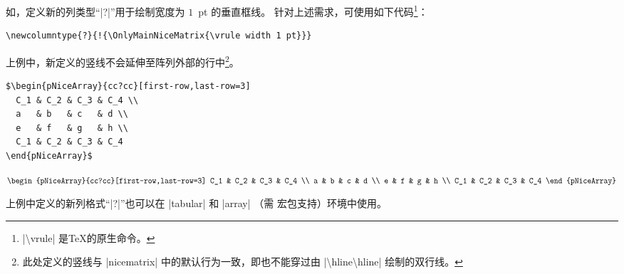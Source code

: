 \documentclass[dvipsnames]{article}%
\begin{document}
如，定义新的列类型“|?|”用于绘制宽度为 $1$~pt 的垂直框线。
针对上述需求，可使用如下代码\footnote{|\textbackslash vrule| 是\TeX 的原生命令。}：

\begin{Verbatim}
\newcolumntype{?}{!{\OnlyMainNiceMatrix{\vrule width 1 pt}}}
\end{Verbatim}

上例中，新定义的竖线不会延伸至阵列外部的行中\footnote{此处定义的竖线与 |nicematrix| 中的默认行为一致，即也不能穿过由 |\textbackslash hline\textbackslash hline| 绘制的双行线。}。
\medskip
\begin{scope}

\begin{BVerbatim}[baseline = c, boxwidth = 10.5cm]
$\begin{pNiceArray}{cc?cc}[first-row,last-row=3]
  C_1 & C_2 & C_3 & C_4 \\
  a   & b   & c   & d \\
  e   & f   & g   & h \\
  C_1 & C_2 & C_3 & C_4
\end{pNiceArray}$
\end{BVerbatim}
$\begin{pNiceArray}{cc?cc}[first-row,last-row=3]
C_1 & C_2 & C_3 & C_4 \\
a & b & c & d \\
e & f & g & h \\
C_1 & C_2 & C_3 & C_4
\end{pNiceArray}$
\end{scope}

\bigskip
上例中定义的新列格式“|?|”也可以在 |{tabular}| 和
|{array}| （需  宏包支持）环境中使用。

\end{document}

